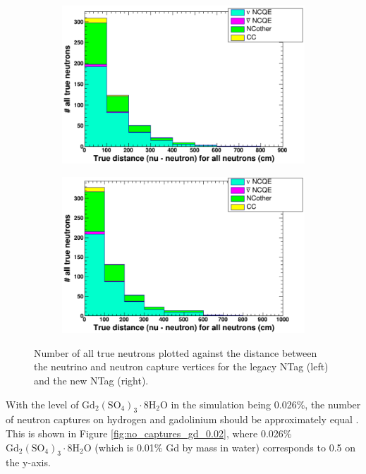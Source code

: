 \begin{figure}
    \centering
     \begin{subfigure}[b]{0.49\linewidth}
      \includegraphics[width=\linewidth]{Figures/TruCapNuNDistanceReductionLegacy.png}
     \end{subfigure}
     \begin{subfigure}[b]{0.49\linewidth}
       \includegraphics[width=\linewidth]{Figures/TruCapNuNDistanceReductionNew.png}
      \end{subfigure} 
      \caption{Number of all true neutrons plotted against the distance between the neutrino and neutron capture vertices for the legacy NTag (left) and the new NTag (right).} 
      \label{fig:TruCapNuNDistanceReduction}
\end{figure}

With the level of $\mathrm{Gd}_{2}\left(\mathrm{SO}_{4}\right)_{3} \cdot 8 \mathrm{H}_{2} \mathrm{O}$ in the simulation being 0.026\%, the number of neutron captures on hydrogen and gadolinium should be approximately equal \cite{Sekiya_2020}. This is shown in Figure \ref{fig:no_captures_gd_0.02}, where 0.026\% $\mathrm{Gd}_{2}\left(\mathrm{SO}_{4}\right)_{3} \cdot 8 \mathrm{H}_{2} \mathrm{O}$ (which is 0.01\% Gd by mass in water) corresponds to 0.5 on the y-axis.
 
